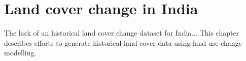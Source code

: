\documentclass{icldt}\usepackage[]{graphicx}\usepackage[]{color}
\begin{document}







\chapter{Land cover change in India}

The lack of an historical land cover change dataset for India... This chapter describes efforts to generate historical land cover data using land use change modelling. \\
\end{document}
